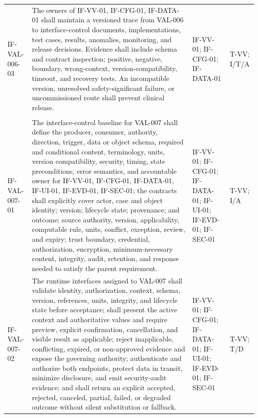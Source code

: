 \documentclass[11pt,letterpaper]{article}
\begin{document}
\begin{scriptsize}
\begin{longtable}{@{}L{0.14\textwidth}L{0.49\textwidth}L{0.19\textwidth}L{0.10\textwidth}@{}}
\addlinespace[2pt]
\mbox{IF-VAL-006-03} & The owners of IF-VV-01, IF-CFG-01, IF-DATA-01 shall maintain a versioned trace from VAL-006 to interface-control documents, implementations, test cases, results, anomalies, monitoring, and release decisions. Evidence shall include schema and contract inspection; positive, negative, boundary, wrong-context, version-compatibility, timeout, and recovery tests. An incompatible version, unresolved safety-significant failure, or uncommissioned route shall prevent clinical release. & IF-VV-01; IF-CFG-01; IF-DATA-01 & T-VV; I\slash\allowbreak{}T\slash\allowbreak{}A \\
\addlinespace[2pt]
 \\
\addlinespace[2pt]
\mbox{IF-VAL-007-01} & The interface-control baseline for VAL-007 shall define the producer, consumer, authority, direction, trigger, data or object schema, required and conditional content, terminology, units, version compatibility, security, timing, state preconditions, error semantics, and accountable owner for IF-VV-01, IF-CFG-01, IF-DATA-01, IF-UI-01, IF-EVD-01, IF-SEC-01; the contracts shall explicitly cover actor, case and object identity; version; lifecycle state; provenance; and outcome; source authority, version, applicability, computable rule, units, conflict, exception, review, and expiry; trust boundary, credential, authorization, encryption, minimum-necessary content, integrity, audit, retention, and response needed to satisfy the parent requirement. & IF-VV-01; IF-CFG-01; IF-DATA-01; IF-UI-01; IF-EVD-01; IF-SEC-01 & T-VV; I\slash\allowbreak{}A \\
\addlinespace[2pt]
\mbox{IF-VAL-007-02} & The runtime interfaces assigned to VAL-007 shall validate identity, authorization, context, schema, version, references, units, integrity, and lifecycle state before acceptance; shall present the active context and authoritative values and require preview, explicit confirmation, cancellation, and visible result as applicable; reject inapplicable, conflicting, expired, or non-approved evidence and expose the governing authority; authenticate and authorize both endpoints, protect data in transit, minimize disclosure, and emit security-audit evidence; and shall return an explicit accepted, rejected, canceled, partial, failed, or degraded outcome without silent substitution or fallback. & IF-VV-01; IF-CFG-01; IF-DATA-01; IF-UI-01; IF-EVD-01; IF-SEC-01 & T-VV; T\slash\allowbreak{}D \\

\end{longtable}
\end{scriptsize}
\end{document}
